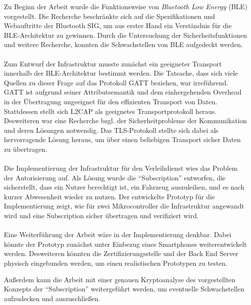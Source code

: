 Zu Beginn der Arbeit wurde die Funktionsweise von \textit{Bluetooth Low Energy} (BLE) vorgestellt. Die Recherche beschränkte sich auf die Spezifikationen und Webauftritte der Bluetooth SIG, um aus erster Hand ein Verständnis für die BLE-Architektur zu gewinnen. Durch die Untersuchung der Sicherheitsfunktionen und weitere Recherche, konnten die Schwachstellen von BLE aufgedeckt werden.
\\\\
Zum Entwurf der Infrastruktur musste zunächst ein geeigneter Transport innerhalb der BLE-Architektur bestimmt werden. Die Tatsache, dass sich viele Quellen zu dieser Frage auf das Protokoll GATT beziehen, war irreführend. GATT ist aufgrund seiner Attributsemantik und dem einhergehenden Overhead in der Übertragung ungeeignet für den effizienten Transport von Daten. Stattdessen stellt sich L2CAP als geeignetes Transportprotokoll heraus. Desweiteren war eine Recherche bzgl. der Sicherheitprobleme der Kommunikation und deren Lösungen notwendig. Das TLS-Protokoll stellte sich dabei als hervorragende Lösung heraus, um über einen beliebigen Transport sicher Daten zu übertragen.
\\\\
Die Implementierung der Infrastruktur für den Verleihdienst wies das Problem der Autorisierung auf. Als Lösung wurde die "`Subscription"' entworfen, die sicherstellt, dass ein Nutzer berechtigt ist, ein Fahrzeug auszuleihen, und es nach kurzer Abwesenheit wieder zu nutzen. Der entwickelte Prototyp für die Implementierung zeigt, wie für zwei Mikrocontroller die Infrastruktur angewandt wird und eine Subscription sicher übertragen und verifiziert wird.
\\\\
Eine Weiterführung der Arbeit wäre in der Implementierung denkbar. Dabei könnte der Prototyp zunächst unter Einbezug eines Smartphones weiterentwickelt werden. Desweiteren könnten die Zertifizierungsstelle und der Back End Server physisch eingebunden werden, um einen realistischen Prototypen zu testen.

Außerdem kann die Arbeit mit einer genauen Kryptoanalyse des vorgestellten Konzepts der "`Subscription"' weitergeführt werden, um eventuelle Schwachstellen aufzudecken und auszuschließen.